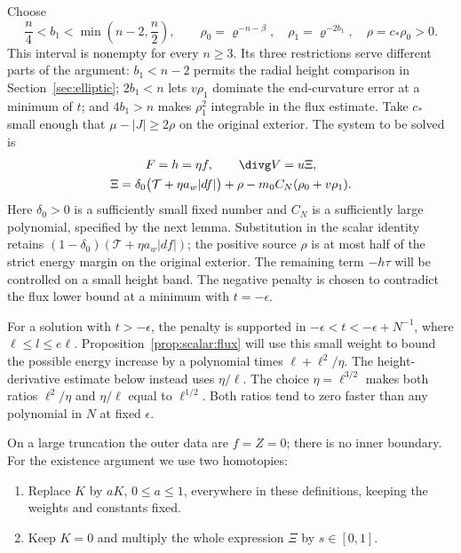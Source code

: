Choose
\begin{equation}
 \frac n4<b_1<\min\left(n-2,\frac n2\right),\qquad
 \rho_0=\varrho^{-n-\beta},\quad \rho_1=\varrho^{-2b_1},\quad
 \rho=c_*\rho_0>0.
 \label{eq:scalar:weights}
\end{equation}
This interval is nonempty for every $n\geq3$.  Its three restrictions
serve different parts of the argument: $b_1<n-2$ permits the radial
height comparison in Section~\ref{sec:elliptic}; $2b_1<n$ lets
$v\rho_1$ dominate the end-curvature error at a minimum of $t$;
and $4b_1>n$ makes $\rho_1^2$ integrable in the flux estimate.
Take $c_*$ small enough that $\mu-|J|\geq2\rho$ on the original
exterior.  The system to be solved is
\begin{equation}
 \begin{gathered}
 F=h=\eta f,\qquad \divg V=u\Xi,\\
 \Xi=\delta_0\bigl(\mathcal T+\eta a_w|df|\bigr)+\rho
                  -m_0 C_N(\rho_0+v\rho_1).
 \end{gathered}
 \label{eq:scalar:system}
\end{equation}
Here $\delta_0>0$ is a sufficiently small fixed number and $C_N$ is
a sufficiently large polynomial, specified by the next lemma.
Substitution in the scalar identity retains
$(1-\delta_0)(\mathcal T+\eta a_w|df|)$; the positive source $\rho$
is at most half of the strict energy margin on the original exterior.
The remaining term $-h\tau$ will be controlled on a small height band.
The negative penalty is chosen to contradict the flux lower bound at
a minimum with $t=-\epsilon$.

For a solution with $t>-\epsilon$, the penalty is supported in
$-\epsilon<t<-\epsilon+N^{-1}$, where $\ell\le l\le e\ell$.
Proposition~\ref{prop:scalar:flux} will use this small weight to bound
the possible energy increase by a polynomial times
$\ell+\ell^2/\eta$.  The height-derivative estimate below instead
uses $\eta/\ell$.  The choice $\eta=\ell^{3/2}$ makes both ratios
$\ell^2/\eta$ and $\eta/\ell$ equal to $\ell^{1/2}$.  Both ratios
tend to zero faster than any polynomial in $N$ at fixed $\epsilon$.

On a large truncation the outer data are $f=Z=0$; there is no inner
boundary.  For the existence argument we use two homotopies:
\begin{enumerate}
\item\label{it:scalar:K-homotopy} Replace $K$ by $aK$,
$0\leq a\leq1$, everywhere in these definitions, keeping the weights
and constants fixed.
\item\label{it:scalar:source-homotopy} Keep $K=0$ and multiply
the whole expression $\Xi$ by $s\in[0,1]$.
\end{enumerate}

